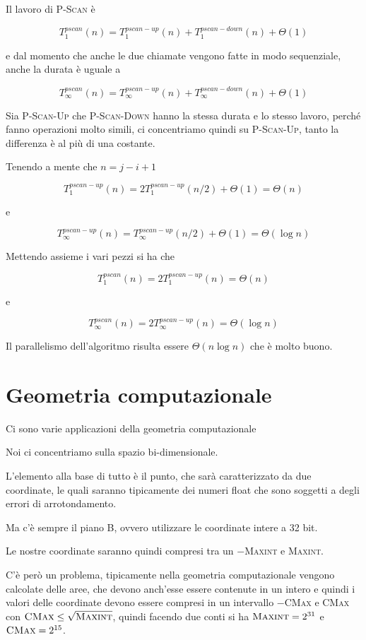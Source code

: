 Il lavoro di \textsc{P-Scan} è

$$
T_{1}^{pscan}(n) = T_{1}^{pscan-up}(n) + T_{1}^{pscan-down}(n) + \Theta(1)
$$

e dal momento che anche le due chiamate vengono fatte in modo
sequenziale, anche la durata è uguale a

$$
T_{\infty}^{pscan}(n) = T_{\infty}^{pscan-up}(n) + T_{\infty}^{pscan-down}(n) + \Theta(1)
$$

Sia \textsc{P-Scan-Up} che \textsc{P-Scan-Down} hanno la stessa durata e lo stesso lavoro, perché fanno operazioni molto simili, ci concentriamo quindi su \textsc{P-Scan-Up}, tanto la differenza è al più di una costante.

Tenendo a mente che $n = j - i +1 $

$$
T_{1}^{pscan-up}(n) = 2 T_{1}^{pscan-up}(n/2) + \Theta(1) = \Theta(n)
$$

e

$$
T_{\infty}^{pscan-up}(n) = T_{\infty}^{pscan-up}(n/2) + \Theta(1) = \Theta(\log n)
$$

Mettendo assieme i vari pezzi si ha che

$$
T_{1}^{pscan}(n) = 2 T_{1}^{pscan-up}(n) = \Theta(n)
$$

e

$$
T_{\infty}^{pscan}(n) = 2T_{\infty}^{pscan-up}(n) = \Theta(\log n)
$$

Il parallelismo dell'algoritmo risulta essere $\Theta(n \log n)$ che è molto buono.


\chapter{Geometria computazionale}

Ci sono varie applicazioni della geometria computazionale

Noi ci concentriamo sulla spazio bi-dimensionale.

L'elemento alla base di tutto è il punto, che sarà caratterizzato da due coordinate, le quali saranno tipicamente dei numeri float che sono soggetti a degli errori di arrotondamento.

Ma c'è sempre il piano B, ovvero utilizzare le coordinate intere a 32 bit.

Le nostre coordinate saranno quindi compresi tra un $-$\textsc{Maxint} e \textsc{Maxint}.

C'è però un problema, tipicamente nella geometria computazionale vengono calcolate delle aree, che devono anch'esse essere contenute in un intero e quindi i valori delle coordinate devono essere compresi in un intervallo $-$\textsc{CMax} e \textsc{CMax} con $\textsc{CMax} \leq \sqrt{\textsc{Maxint}}$, quindi facendo due conti si ha $\textsc{Maxint} = 2^{31} $ e $\textsc{CMax} = 2^{15}$.

